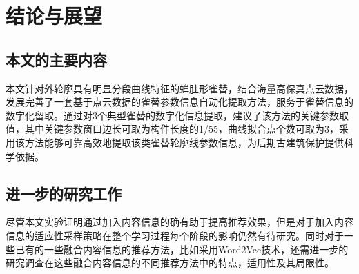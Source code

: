 \section{结论与展望}

\subsection{本文的主要内容}

本文针对外轮廓具有明显分段曲线特征的蝉肚形雀替，结合海量高保真点云数据，发展完善了一套基于点云数据的雀替参数信息自动化提取方法，服务于雀替信息的数字化留取。通过对3个典型雀替的数字化信息提取，建议了该方法的关键参数取值，其中关键参数窗口边长可取为构件长度的1/55，曲线拟合点个数可取为3，采用该方法能够可靠高效地提取该类雀替轮廓线参数信息，为后期古建筑保护提供科学依据。

\subsection{进一步的研究工作}

尽管本文实验证明通过加入内容信息的确有助于提高推荐效果，但是对于加入内容信息的适应性采样策略在整个学习过程每个阶段的影响仍然有待研究。同时对于一些已有的一些融合内容信息的推荐方法，比如采用Word2Vec技术，还需进一步的研究调查在这些融合内容信息的不同推荐方法中的特点，适用性及其局限性。